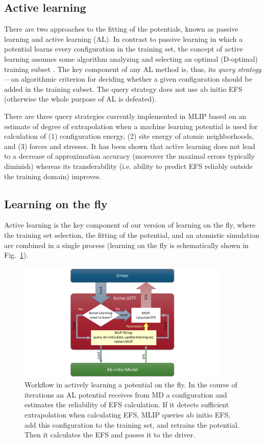 \documentclass[12pt]{article}
\renewcommand{\_}{\char`_}
\begin{document}
\subsection{Active learning}

There are two approaches to the fitting of the potentials, known as passive learning and active learning (AL).
In contrast to passive learning in which a potential learns every configuration in the training set, the concept of active learning assumes some algorithm analyzing and selecting an optimal (D-optimal) training subset \cite{ActiveLearning}. The key component of any AL method is, thus, its \emph{query strategy}---an algorithmic criterion for deciding whether a given configuration should be added in the training subset. 
The query strategy does not use ab initio EFS (otherwise the whole purpose of AL is defeated).

There are three query strategies currently implemented in MLIP based on an estimate of degree of extrapolation when a machine learning potential is used for calculation of (1) configuration energy, (2) site energy of atomic neighborhoods, and (3) forces and stresses.
It has been shown that active learning does not lead to a decrease of approximation accuracy (moreover the maximal errors typically diminish) whereas its transferability (i.e. ability to predict EFS reliably outside the training domain) improves.

\subsection{Learning on the fly}

Active learning is the key component of our version of learning on the fly, where the training set selection, the fitting of the potential, and an atomistic simulation are combined in a single process (learning on the fly is schematically shown in Fig.\ \ref{fig:LOTF}).

\begin{figure}[htbp]
	\centering
	\includegraphics[width=4.0in]{figs/LOTF.pdf}
	\caption{Workflow in actively learning a potential on the fly.
		In the course of iterations an AL potential receives from MD a configuration and estimates the reliability of EFS calculation.
		If it detects sufficient extrapolation when calculating EFS, MLIP queries ab initio EFS, add this configuration to the training set, and retrains the potential.
		Then it calculates the EFS and passes it to the driver.
	}
	\label{fig:LOTF}
\end{figure}
\end{document}
